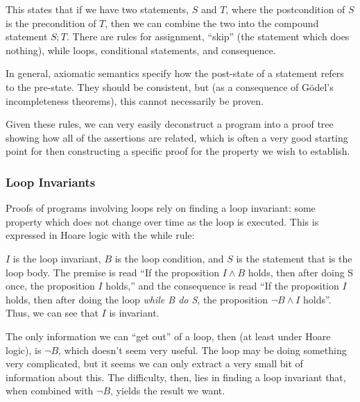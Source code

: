 \begin{prooftree}
\end{prooftree}

This states that if we have two statements, $S$ and $T$, where the
postcondition of $S$ is the precondition of $T$, then we can combine
the two into the compound statement $S;T$\cite{Hoare69}. There are
rules for assignment, ``skip'' (the statement which does nothing),
while loops, conditional statements, and consequence.

In general, axiomatic semantics specify how the post-state of a
statement refers to the pre-state. They should be consistent, but (as
a consequence of G{\"o}del's incompleteness theorems), this cannot
necessarily be proven.

Given these rules, we can very easily deconstruct a program into a
proof tree showing how all of the assertions are related, which is
often a very good starting point for then constructing a specific
proof for the property we wish to establish.

\subsubsection{Loop Invariants}
\label{sec:lit-verification-embedding-invariants}

Proofs of programs involving loops rely on finding a \gls{loop
  invariant}: some property which does not change over time as the
loop is executed. This is expressed in Hoare logic with the while
rule:

\begin{prooftree}
\end{prooftree}

$I$ is the loop invariant, $B$ is the loop condition, and $S$ is the
statement that is the loop body. The premise is read ``If the
proposition $I \land B$ holds, then after doing S once, the
proposition $I$ holds,'' and the consequence is read ``If the
proposition $I$ holds, then after doing the loop \textit{while B do
  S}, the proposition $\lnot B \land I$ holds''. Thus, we can see that
$I$ is invariant.

The only information we can ``get out'' of a loop, then (at least
under Hoare logic), is $\lnot B$, which doesn't seem very useful. The
loop may be doing something very complicated, but it seems we can only
extract a very small bit of information about this. The difficulty,
then, lies in finding a loop invariant that, when combined with $\lnot
B$, yields the result we want.

